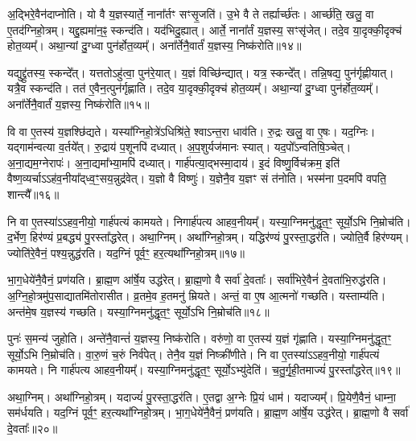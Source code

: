 अ॒द्भिरे॒वैन॑दाप्नोति।
यो वै य॒ज्ञस्यार्ते॒ नाना᳚र्तꣳ सꣳसृ॒जति॑।
उ॒भे वै ते तर्ह्यार्च्छ॑तः।
आर्च्छ॑ति॒ खलु॒ वा ए॒तद॑ग्निहो॒त्रम्।
यद्दु॒ह्यमा॑न॒ꣴ॒ स्कन्द॑ति।
यद॑भिदु॒ह्यात्।
आर्ते॒ नाना᳚र्तं य॒ज्ञस्य॒ सꣳसृ॑जेत्।
तदे॒व या॒दृक्की॒दृक्च॑ होत॒व्यम्᳚।
अथा॒न्यां दु॒ग्ध्वा पुन॑र्\mbox{}होत॒व्यम्᳚।
अना᳚र्तेनै॒वार्तं॑ य॒ज्ञस्य॒ निष्क॑रोति॥१४॥

यद्युद्द्रु॑तस्य॒ स्कन्दे᳚त्।
यत्ततो\-ऽहु॑त्वा॒ पुन॑रे॒यात्।
य॒ज्ञं वि\-च्छि॑न्द्यात्।
यत्र॒ स्कन्दे᳚त्।
तन्नि॒षद्य॒ पुन॑र्गृह्णीयात्।
यत्रै॒व स्कन्द॑ति।
तत॑ ए॒वैन॒त्पुन॑र्गृह्णाति।
तदे॒व या॒दृक्की॒दृक्च॑ होत॒व्यम्᳚।
अथा॒न्यां दु॒ग्ध्वा पुन॑र्\mbox{}होत॒व्यम्᳚।
अना᳚र्तेनै॒वार्तं॑ य॒ज्ञस्य॒ निष्क॑रोति॥१५॥

वि वा ए॒तस्य॑ य॒ज्ञश्छि॑द्यते।
यस्या᳚ग्निहो॒त्रे॑\-ऽधिश्रि॑ते॒ श्वा\-ऽन्त॒रा धाव॑ति।
रु॒द्रः खलु॒ वा ए॒षः।
यद॒ग्निः।
यद्गाम॑न्वत्या व॒र्तये᳚त्।
रु॒द्राय॑ प॒शूनपि॑ दध्यात्।
अ॒प॒शुर्यज॑मानः स्यात्।
यद॒पो᳚\-ऽन्वतिषि॒ञ्चेत्।
अ॒ना॒द्यम॒ग्नेरापः॑।
अ॒ना॒द्यमा᳚भ्या॒मपि॑ दध्यात्।
गार्\mbox{}ह॑पत्या॒द्भस्मा॒दाय॑।
इ॒दं विष्णु॒र्विच॑क्रम॒ इति॑ वैष्ण॒व्यर्चा\-ऽऽह॑व॒नीया᳚द्‌ध्व॒ꣳ॒सय॒न्नुद्र॑वेत्।
य॒ज्ञो वै विष्णुः॑।
य॒ज्ञेनै॒व य॒ज्ञꣳ सं त॑नोति।
भस्म॑ना प॒दमपि॑ वपति॒ शान्त्यै᳚॥१६॥\anuvakamend[वै दे॒व्यदि॑तिर्मुञ्चति \-सृजति करोति करोत्याभ्या॒मपि॑ दध्या॒त् पञ्च॑ च]

नि वा ए॒तस्या॑\-ऽऽहव॒नीयो॒ गार्\mbox{}ह॑पत्यं कामयते।
निगार्\mbox{}ह॑पत्य आहव॒नीयम्᳚।
यस्या॒ग्निमनु॑द्धृत॒ꣳ॒ सूर्यो॒ऽभि नि॒म्रोच॑ति।
द॒र्भेण॒ हिर॑ण्यं प्र॒बद्ध्य॑ पु॒रस्ता᳚द्धरेत्।
अथा॒ग्निम्।
अथा᳚ग्निहो॒त्रम्।
यद्धिर॑ण्यं पु॒रस्ता॒द्धर॑ति।
ज्योति॒र्वै हिर॑ण्यम्।
ज्योति॑रे॒वैनं॒ पश्य॒न्नुद्ध॑रति।
यद॒ग्निं पूर्व॒ꣳ॒ हर॒त्यथा᳚ग्निहो॒त्रम्॥१७॥

भा॒ग॒धेये॑नै॒वैनं॒ प्रण॑यति।
ब्रा॒ह्म॒ण आ॑र्\mbox{}षे॒य उद्ध॑रेत्।
ब्रा॒ह्म॒णो वै सर्वा॑ दे॒वताः᳚।
सर्वा॑भिरे॒वैनं॑ दे॒वता॑भि॒रुद्ध॑रति।
अ॒ग्नि॒हो॒त्रमु॑प॒साद्यातमि॑तोरासीत।
व्र॒तमे॒व ह॒तमनु॑ म्रियते।
अन्तं॒ वा ए॒ष आ॒त्मनो॑ गच्छति।
यस्ताम्य॑ति।
अन्त॑मे॒ष य॒ज्ञस्य॑ गच्छति।
यस्या॒ग्निमनु॑द्धृत॒ꣳ॒ सूर्यो॒ऽभि नि॒म्रोच॑ति॥१८॥

पुनः॑ स॒मन्य॑ जुहोति।
अन्ते॑नै॒वान्तं॑ य॒ज्ञस्य॒ निष्क॑रोति।
वरु॑णो॒ वा ए॒तस्य॑ य॒ज्ञं गृ॑ह्णाति।
यस्या॒ग्निमनु॑द्धृत॒ꣳ॒ सूर्यो॒ऽभि नि॒म्रोच॑ति।
वा॒रु॒णं च॒रुं निर्व॑पेत्।
तेनै॒व य॒ज्ञं निष्क्री॑णीते।
नि वा ए॒तस्या॑\-ऽऽहव॒नीयो॒ गार्\mbox{}ह॑पत्यं कामयते।
नि गार्\mbox{}ह॑पत्य आहव॒नीयम्᳚।
यस्या॒ग्निमनु॑द्धृत॒ꣳ॒ सूर्यो॒\-ऽभ्यु॑देति॑।
च॒तु॒र्गृ॒ही॒तमाज्यं॑ पु॒रस्ता᳚द्धरेत्॥१९॥

अथा॒ग्निम्।
अथा᳚ग्निहो॒त्रम्।
यदाज्यं॑ पु॒रस्ता॒द्धर॑ति।
ए॒तद्वा अ॒ग्नेः प्रि॒यं धाम॑।
यदाज्यम्᳚।
प्रि॒येणै॒वैनं॒ धाम्ना॒ सम॑र्धयति।
यद॒ग्निं पूर्व॒ꣳ॒ हर॒त्यथा᳚ग्निहो॒त्रम्।
भा॒ग॒धेये॑नै॒वैनं॒ प्रण॑यति।
ब्रा॒ह्म॒ण आ॑र्\mbox{}षे॒य उद्ध॑रेत्।
ब्रा॒ह्म॒णो वै सर्वा॑ दे॒वताः᳚॥२०॥

